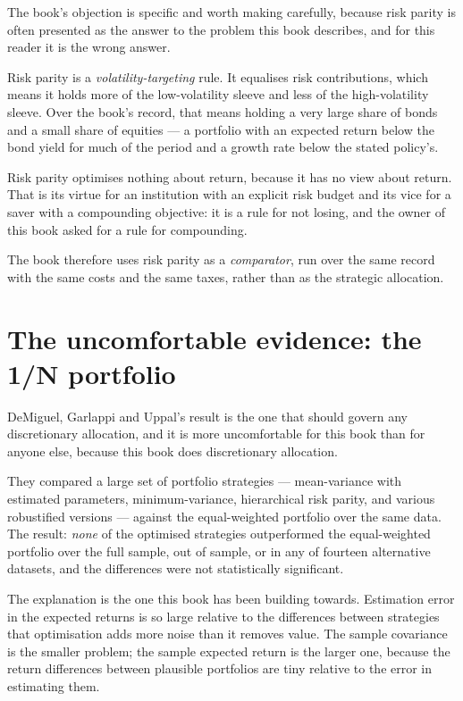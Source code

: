 The book's objection is specific and worth making carefully, because
risk parity is often presented as the answer to the problem this book
describes, and for this reader it is the wrong answer.

Risk parity is a \emph{volatility-targeting} rule. It equalises risk
contributions, which means it holds more of the low-volatility sleeve and
less of the high-volatility sleeve. Over the book's record, that means
holding a very large share of bonds and a small share of equities --- a
portfolio with an expected return below the bond yield for much of the
period and a growth rate below the stated policy's.

Risk parity optimises nothing about return, because it has no view about
return. That is its virtue for an institution with an explicit risk
budget and its vice for a saver with a compounding objective: it is a
rule for not losing, and the owner of this book asked for a rule for
compounding.

The book therefore uses risk parity as a \emph{comparator}, run over the
same record with the same costs and the same taxes, rather than as the
strategic allocation.

\section{The uncomfortable evidence: the 1/N portfolio}

DeMiguel, Garlappi and Uppal's result is the one that should govern any
discretionary allocation, and it is more uncomfortable for this book than
for anyone else, because this book does discretionary allocation.

They compared a large set of portfolio strategies --- mean-variance with
estimated parameters, minimum-variance, hierarchical risk parity, and
various robustified versions --- against the equal-weighted portfolio over
the same data. The result: \emph{none} of the optimised strategies
outperformed the equal-weighted portfolio over the full sample, out of
sample, or in any of fourteen alternative datasets, and the differences
were not statistically significant.

The explanation is the one this book has been building towards. Estimation
error in the expected returns is so large relative to the differences
between strategies that optimisation adds more noise than it removes
value. The sample covariance is the smaller problem; the sample expected
return is the larger one, because the return differences between
plausible portfolios are tiny relative to the error in estimating them.

